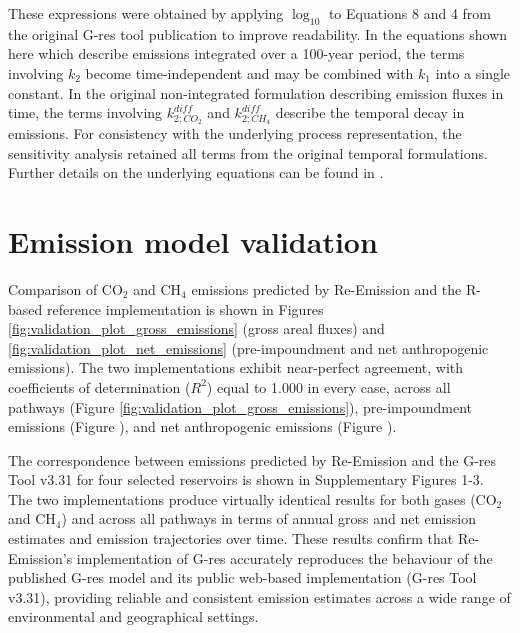 \documentclass[review, authoryear, 1p]{elsarticle} %
\begin{document}
These expressions were obtained by applying $\log_{10}$ to Equations 8 and 4 from the original G-res tool publication \citep{Prairie2017b} to improve readability.
In the equations shown here which describe emissions integrated over a 100-year period, the terms involving $k_2$ become time-independent and may be combined with $k_1$ into a single constant.
In the original non-integrated formulation describing emission fluxes in time, the terms involving $k_{2 ; CO_2}^{diff}$ and $k_{2 ; CH_4}^{diff}$ describe the temporal decay in emissions.
For consistency with the underlying process representation, the sensitivity analysis retained all terms from the original temporal formulations.
Further details on the underlying equations can be found in \citet{Prairie2017b}.


\section{Emission model validation}
\label{sec:validation}


Comparison of CO$_2$ and CH$_4$ emissions predicted by Re-Emission and the R-based reference implementation is shown in Figures \ref{fig:validation_plot_gross_emissions} (gross areal fluxes) and \ref{fig:validation_plot_net_emissions} (pre-impoundment and net anthropogenic emissions).
The two implementations exhibit near-perfect agreement, with coefficients of determination ($R^2$) equal to 1.000 in every case, across all pathways (Figure \ref{fig:validation_plot_gross_emissions}), pre-impoundment emissions (Figure ), and net anthropogenic emissions (Figure ).

The correspondence between emissions predicted by Re-Emission and the G-res Tool v3.31 for four selected reservoirs is shown in Supplementary Figures 1-3.
The two implementations produce virtually identical results for both gases (CO$_2$ and CH$_4$) and across all pathways in terms of annual gross and net emission estimates and emission trajectories over time.
These results confirm that Re-Emission's implementation of G-res accurately reproduces the behaviour of the published G-res model \citep{Prairie2021} and its public web-based implementation (G-res Tool v3.31), providing reliable and consistent emission estimates across a wide range of environmental and geographical settings.
\end{document}
